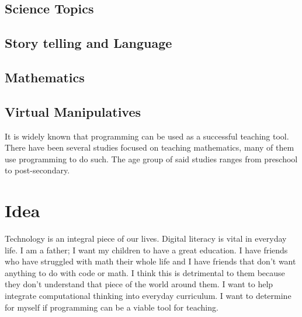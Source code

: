 \documentclass[12pt]{article}
\begin{document}
\subsection{Science Topics} \cite{guzdial}
\subsection{Story telling and Language} \cite{}
\subsection{Mathematics} \cite{}
\subsection{Virtual Manipulatives}\cite{lye}

It is widely known that programming can be used as a successful teaching tool.
There have been several studies focused on teaching mathematics, many of them use programming to do such.
The age group of said studies ranges from preschool to post-secondary.

\section*{Idea}
Technology is an integral piece of our lives. Digital literacy is vital in everyday life.
I am a father; I want my children to have a great education.
I have friends who have struggled with math their whole life and I have friends that don't want anything to do with code or math. I think this is detrimental to them because they don't understand that piece of the world around them. 
I want to help integrate computational thinking into everyday curriculum.
I want to determine for myself if programming can be a viable tool for teaching.
\end{document}
